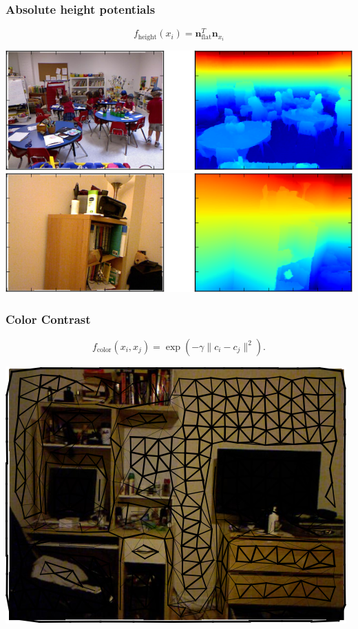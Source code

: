 \documentclass[final,ignorenonframetext,compress]{beamer}
\begin{document}
    \begin{frame}
        \frametitle{Absolute height potentials}
            \[
                f_{\text{height}}(x_i) = \textbf{n}_{\text{flat}}^T \textbf{n}_{x_i}
            \]
        \begin{center}
            \includegraphics[width=.6\linewidth]{images/height_success}\\
            \vspace{3mm}
            \includegraphics[width=.6\linewidth]{images/height_failure}
        \end{center}

    \end{frame}


    \begin{frame}
        \frametitle{Color Contrast}
        \[
        f_\text{color}(x_i, x_j) = \exp\left(-\gamma \lVert c_i - c_j \rVert^2\right).
         \]
            \begin{center}
                \includegraphics[width=.6\linewidth]{images/00062_pipline_feature_pairwise_1}
            \end{center}

    \end{frame}
\end{document}
